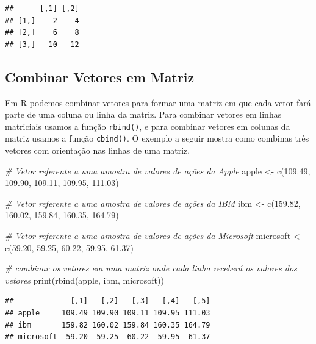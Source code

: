 \documentclass[
]{article}
\newenvironment{Shaded}{\begin{snugshade}}{\end{snugshade}}
\newcommand{\CommentTok}[1]{\textcolor[rgb]{0.56,0.35,0.01}{\textit{#1}}}
\newcommand{\FloatTok}[1]{\textcolor[rgb]{0.00,0.00,0.81}{#1}}
\newcommand{\FunctionTok}[1]{\textcolor[rgb]{0.00,0.00,0.00}{#1}}
\newcommand{\NormalTok}[1]{#1}
\newcommand{\OtherTok}[1]{\textcolor[rgb]{0.56,0.35,0.01}{#1}}
\begin{document}
\begin{verbatim}
##      [,1] [,2]
## [1,]    2    4
## [2,]    6    8
## [3,]   10   12
\end{verbatim}

\hypertarget{combinar-vetores-em-matriz}{%
\subsection{Combinar Vetores em
Matriz}\label{combinar-vetores-em-matriz}}

Em R podemos combinar vetores para formar uma matriz em que cada vetor
fará parte de uma coluna ou linha da matriz. Para combinar vetores em
linhas matriciais usamos a função \texttt{rbind()}, e para combinar
vetores em colunas da matriz usamos a função \texttt{cbind()}. O exemplo
a seguir mostra como combinas três vetores com orientação nas linhas de
uma matriz.

\begin{Shaded}
\begin{Highlighting}[]
\CommentTok{\# Vetor referente a uma amostra de valores de ações da Apple}
\NormalTok{apple }\OtherTok{\textless{}{-}} \FunctionTok{c}\NormalTok{(}\FloatTok{109.49}\NormalTok{, }\FloatTok{109.90}\NormalTok{, }\FloatTok{109.11}\NormalTok{, }\FloatTok{109.95}\NormalTok{, }\FloatTok{111.03}\NormalTok{)}

\CommentTok{\# Vetor referente a uma amostra de valores de ações da IBM}
\NormalTok{ibm }\OtherTok{\textless{}{-}} \FunctionTok{c}\NormalTok{(}\FloatTok{159.82}\NormalTok{, }\FloatTok{160.02}\NormalTok{, }\FloatTok{159.84}\NormalTok{, }\FloatTok{160.35}\NormalTok{, }\FloatTok{164.79}\NormalTok{)}

\CommentTok{\# Vetor referente a uma amostra de valores de ações da Microsoft}
\NormalTok{microsoft }\OtherTok{\textless{}{-}} \FunctionTok{c}\NormalTok{(}\FloatTok{59.20}\NormalTok{, }\FloatTok{59.25}\NormalTok{, }\FloatTok{60.22}\NormalTok{, }\FloatTok{59.95}\NormalTok{, }\FloatTok{61.37}\NormalTok{)}

\CommentTok{\# combinar os vetores em uma matriz onde cada linha receberá os valores dos vetores}
\FunctionTok{print}\NormalTok{(}\FunctionTok{rbind}\NormalTok{(apple, ibm, microsoft))}
\end{Highlighting}
\end{Shaded}

\begin{verbatim}
##             [,1]   [,2]   [,3]   [,4]   [,5]
## apple     109.49 109.90 109.11 109.95 111.03
## ibm       159.82 160.02 159.84 160.35 164.79
## microsoft  59.20  59.25  60.22  59.95  61.37
\end{verbatim}
\end{document}
